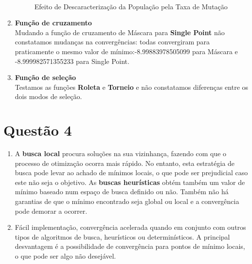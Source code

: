 \documentclass[a4paper, 12pt]{article}
\begin{document}
\begin{enumerate}[label=\alph*)]
\begin{figure}[H]
{						}
						~
					\caption{Efeito de Descaracterização da População pela Taxa de Mutação}
				\end{figure}
			\item \textbf{Função de cruzamento}\\
			Mudando a função de cruzamento de Máscara para \textbf{Single Point} não constatamos mudanças na convergências: todas convergiram para praticamente o mesmo valor de mínimo:-8.99883978505099 para Máscara e -8.999982571355233 para Single Point.
			\item \textbf{Função de seleção}\\
			Testamos as funções \textbf{Roleta} e \textbf{Torneio} e não constatamos diferenças entre os dois modos de seleção.
		\end{enumerate}
	 
	\section{Questão 4}
		\begin{enumerate}[label=\alph*)]
			\item A \textbf{busca local} procura soluções na sua vizinhança, fazendo com que o processo de otimização ocorra mais rápido.  No entanto, esta estratégia de busca pode levar ao achado de mínimos locais, o que pode ser prejudicial caso este não seja o objetivo.  As \textbf{buscas heurísticas} obtém também um valor de mínimo baseado num espaço de busca definido ou não.  Também não há garantias de que o mínimo encontrado seja global ou local e a convergência pode demorar a ocorrer.
			\item Fácil implementação, convergência acelerada quando em conjunto com outros tipos de algoritmos de busca, heurísticos ou determinísticos.  A principal desvantagem é a possibilidade de convergência para pontos de mínimo locais, o que pode ser algo não desejável.
		\end{enumerate}
	
\end{document}
